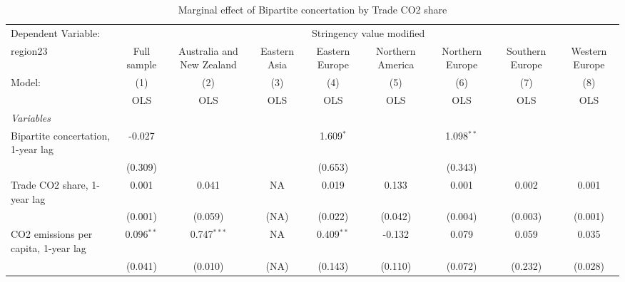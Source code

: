 
\begin{table}[htbp]
   \caption{Marginal effect of Bipartite concertation by Trade CO2 share}
   \centering
   \begin{tabular}{lcccccccc}
      \toprule
      Dependent Variable: & \multicolumn{8}{c}{Stringency value modified}\\
      region23                                                         & Full sample   & Australia and New Zealand & Eastern Asia & Eastern Europe & Northern America & Northern Europe & Southern Europe & Western Europe \\   
      Model:                                                           & (1)           & (2)                       & (3)          & (4)            & (5)              & (6)             & (7)             & (8)\\  
                                                                       &  OLS          & OLS                       & OLS          & OLS            & OLS              & OLS             & OLS             & OLS\\  
      \midrule
      \emph{Variables}\\
      Bipartite concertation, 1-year lag                               & -0.027        &                           &              & 1.609$^{*}$    &                  & 1.098$^{**}$    &                 &   \\   
                                                                       & (0.309)       &                           &              & (0.653)        &                  & (0.343)         &                 &   \\   
      Trade CO2 share, 1-year lag                                      & 0.001         & 0.041                     & NA           & 0.019          & 0.133            & 0.001           & 0.002           & 0.001\\   
                                                                       & (0.001)       & (0.059)                   & (NA)         & (0.022)        & (0.042)          & (0.004)         & (0.003)         & (0.001)\\   
      CO2 emissions per capita, 1-year lag                             & 0.096$^{**}$  & 0.747$^{***}$             & NA           & 0.409$^{**}$   & -0.132           & 0.079           & 0.059           & 0.035\\   
                                                                       & (0.041)       & (0.010)                   & (NA)         & (0.143)        & (0.110)          & (0.072)         & (0.232)         & (0.028)\\   

\end{tabular}
\end{table}
